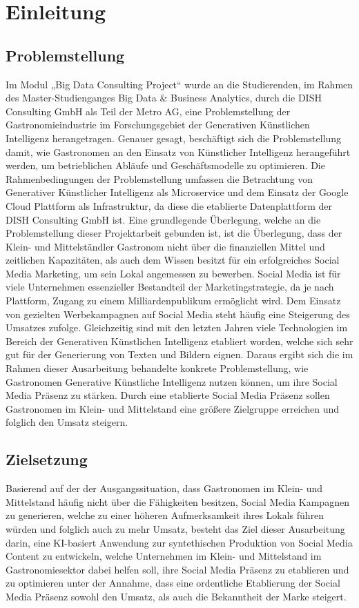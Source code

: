 \section{Einleitung}
\subsection{Problemstellung}
Im Modul „Big Data Consulting Project“ wurde an die Studierenden, im Rahmen des Master-Studienganges Big Data \& Business Analytics, durch die DISH Consulting GmbH als Teil der Metro AG, eine Problemstellung der Gastronomieindustrie im Forschungsgebiet der Generativen Künstlichen Intelligenz herangetragen.
Genauer gesagt, beschäftigt sich die Problemstellung damit, wie Gastronomen an den Einsatz von Künstlicher Intelligenz herangeführt werden, um betrieblichen Abläufe und Geschäftsmodelle zu optimieren.
Die Rahmenbedingungen der Problemstellung umfassen die Betrachtung von Generativer Künstlicher Intelligenz als Microservice und dem Einsatz der Google Cloud Plattform als Infrastruktur, da diese die etablierte Datenplattform der DISH Consulting GmbH ist.
Eine grundlegende Überlegung, welche an die Problemstellung dieser Projektarbeit gebunden ist, ist die Überlegung, dass der Klein- und Mittelständler Gastronom nicht über die finanziellen Mittel und zeitlichen Kapazitäten, als auch dem Wissen besitzt für ein erfolgreiches Social Media Marketing, um sein Lokal angemessen zu bewerben.
Social Media ist für viele Unternehmen essenzieller Bestandteil der Marketingstrategie, da je nach Plattform, Zugang zu einem Milliardenpublikum ermöglicht wird.
Dem Einsatz von gezielten Werbekampagnen auf Social Media steht häufig eine Steigerung des Umsatzes zufolge.
Gleichzeitig sind mit den letzten Jahren viele Technologien im Bereich der Generativen Künstlichen Intelligenz etabliert worden, welche sich sehr gut für der Generierung von Texten und Bildern eignen.
Daraus ergibt sich die im Rahmen dieser Ausarbeitung behandelte konkrete Problemstellung, wie Gastronomen Generative Künstliche Intelligenz nutzen können, um ihre Social Media Präsenz zu stärken.
Durch eine etablierte Social Media Präsenz sollen Gastronomen im Klein- und Mittelstand eine größere Zielgruppe erreichen und folglich den Umsatz steigern.

\subsection{Zielsetzung}
Basierend auf der der Ausgangssituation, dass Gastronomen im Klein- und Mittelstand häufig nicht über die Fähigkeiten besitzen, Social Media Kampagnen zu generieren, welche zu einer höheren Aufmerksamkeit ihres Lokals führen würden und folglich auch zu mehr Umsatz, besteht das Ziel dieser Ausarbeitung darin, eine KI-basiert Anwendung zur syntethischen Produktion von Social Media Content zu entwickeln, welche Unternehmen im Klein- und Mittelstand im Gastronomiesektor dabei helfen soll, ihre Social Media Präsenz zu etablieren und zu optimieren unter der Annahme, dass eine ordentliche Etablierung der Social Media Präsenz sowohl den Umsatz, als auch die Bekanntheit der Marke steigert.


